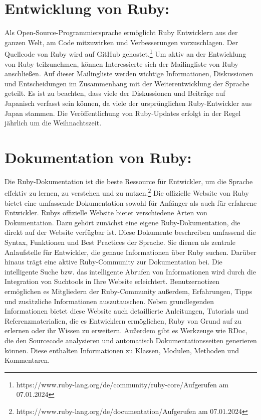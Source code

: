 \documentclass{article}
\begin{document}
\section*{Entwicklung von Ruby:}
Als Open-Source-Programmiersprache ermöglicht Ruby Entwicklern aus der ganzen Welt, am Code mitzuwirken und Verbesserungen vorzuschlagen. Der Quellcode von Ruby wird auf GitHub gehostet.\footnote{https://www.ruby-lang.org/de/community/ruby-core/Aufgerufen am 07.01.2024}
Um aktiv an der Entwicklung von Ruby teilzunehmen, können Interessierte sich der Mailingliste von Ruby anschließen. Auf dieser Mailingliste werden wichtige Informationen, Diskussionen und Entscheidungen im Zusammenhang mit der Weiterentwicklung der Sprache geteilt. Es ist zu beachten, dass viele der Diskussionen und Beiträge auf Japanisch verfasst sein können, da viele der ursprünglichen Ruby-Entwickler aus Japan stammen.
Die Veröffentlichung von Ruby-Updates erfolgt in der Regel jährlich um die Weihnachtszeit.
\section*{Dokumentation von Ruby:}

Die Ruby-Dokumentation ist die beste Ressource für Entwickler, um die Sprache effektiv zu lernen, zu verstehen und zu nutzen.\footnote{https://www.ruby-lang.org/de/documentation/Aufgerufen am 07.01.2024}
Die offizielle Website von Ruby bietet eine umfassende Dokumentation sowohl für Anfänger als auch für erfahrene Entwickler.
Rubys offizielle Website bietet verschiedene Arten von Dokumentation.
Dazu gehört zunächst eine eigene Ruby-Dokumentation, die direkt auf der Website verfügbar ist.
Diese Dokumente beschreiben umfassend die Syntax, Funktionen und Best Practices der Sprache.
Sie dienen als zentrale Anlaufstelle für Entwickler, die genaue Informationen über Ruby suchen.
Darüber hinaus trägt eine aktive Ruby-Community zur Dokumentation bei.
Die intelligente Suche bzw.
das intelligente Abrufen von Informationen wird durch die Integration von Suchtools in Ihre Website erleichtert.
Benutzernotizen ermöglichen es Mitgliedern der Ruby-Community außerdem, Erfahrungen, Tipps und zusätzliche Informationen auszutauschen.
Neben grundlegenden Informationen bietet diese Website auch detaillierte Anleitungen, Tutorials und Referenzmaterialien, die es Entwicklern ermöglichen, Ruby von Grund auf zu erlernen oder ihr Wissen zu erweitern.
Außerdem gibt es Werkzeuge wie RDoc, die den Sourcecode analysieren und automatisch Dokumentationsseiten generieren können. Diese enthalten Informationen zu Klassen, Modulen, Methoden und Kommentaren.
\end{document}
